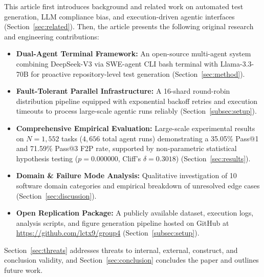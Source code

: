 This article first introduces background and related work on automated test generation, LLM compliance bias, and execution-driven agentic interfaces (Section~\ref{sec:related}). Then, the article presents the following original research and engineering contributions:
\begin{itemize}
    \item \textbf{Dual-Agent Terminal Framework:} An open-source multi-agent system combining DeepSeek-V3 via SWE-agent CLI bash terminal with Llama-3.3-70B for proactive repository-level test generation (Section~\ref{sec:method}).
    \item \textbf{Fault-Tolerant Parallel Infrastructure:} A 16-shard round-robin distribution pipeline equipped with exponential backoff retries and execution timeouts to process large-scale agentic runs reliably (Section~\ref{subsec:setup}).
    \item \textbf{Comprehensive Empirical Evaluation:} Large-scale experimental results on $N=1,552$ tasks ($4,656$ total agent runs) demonstrating a 35.05\% Pass@1 and 71.59\% Pass@3 F2P rate, supported by non-parametric statistical hypothesis testing ($p = 0.000000$, Cliff's $\delta = 0.3018$) (Section~\ref{sec:results}).
    \item \textbf{Domain \& Failure Mode Analysis:} Qualitative investigation of 10 software domain categories and empirical breakdown of unresolved edge cases (Section~\ref{sec:discussion}).
    \item \textbf{Open Replication Package:} A publicly available dataset, execution logs, analysis scripts, and figure generation pipeline hosted on GitHub at \url{https://github.com/lctx9/group4} (Section~\ref{subsec:setup}).
\end{itemize}

Section~\ref{sec:threats} addresses threats to internal, external, construct, and conclusion validity, and Section~\ref{sec:conclusion} concludes the paper and outlines future work.
